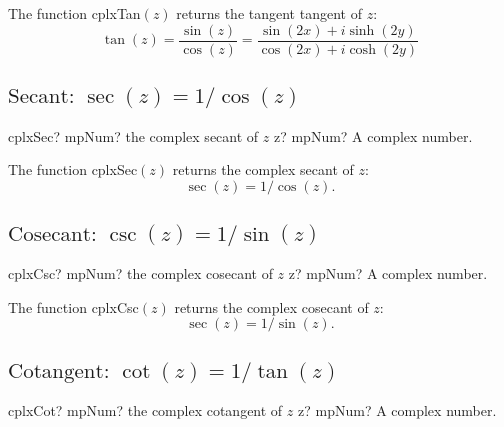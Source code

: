 \vspace{0.3cm}
The function \textsf{cplxTan$(z)$} returns the tangent tangent of $z$: 
\begin{equation}
	\tan(z) =\frac{\sin(z)}{\cos(z)} = \frac{\sin(2x)+i \sinh(2y)}{\cos(2x)+i \cosh(2y)}
\end{equation}






\newpage
\subsection{\texorpdfstring{$\text{Secant: }\sec(z) = 1/\cos(z)$}{sec}}

\begin{mpFunctionsExtract}
	\mpFunctionOne
	{cplxSec? mpNum? the complex secant of $z$}
	{z? mpNum? A complex number.}
\end{mpFunctionsExtract}

\vspace{0.3cm}
The function \textsf{cplxSec$(z)$} returns the complex secant of $z$: 
\begin{equation}
	\sec(z) = 1/\cos(z).
\end{equation}



\newpage
\subsection{\texorpdfstring{$\text{Cosecant: }\csc(z) = 1/\sin(z)$}{csc}}

\begin{mpFunctionsExtract}
	\mpFunctionOne
	{cplxCsc? mpNum? the complex cosecant of $z$}
	{z? mpNum? A complex number.}
\end{mpFunctionsExtract}

\vspace{0.3cm}
The function \textsf{cplxCsc$(z)$} returns the complex cosecant of $z$: 
\begin{equation}
	\sec(z) = 1/\sin(z).
\end{equation}



\newpage
\subsection{\texorpdfstring{$\text{Cotangent: }\cot(z) = 1/\tan(z)$}{cot}}

\begin{mpFunctionsExtract}
	\mpFunctionOne
	{cplxCot? mpNum? the complex cotangent of $z$}
	{z? mpNum? A complex number.}
\end{mpFunctionsExtract}

